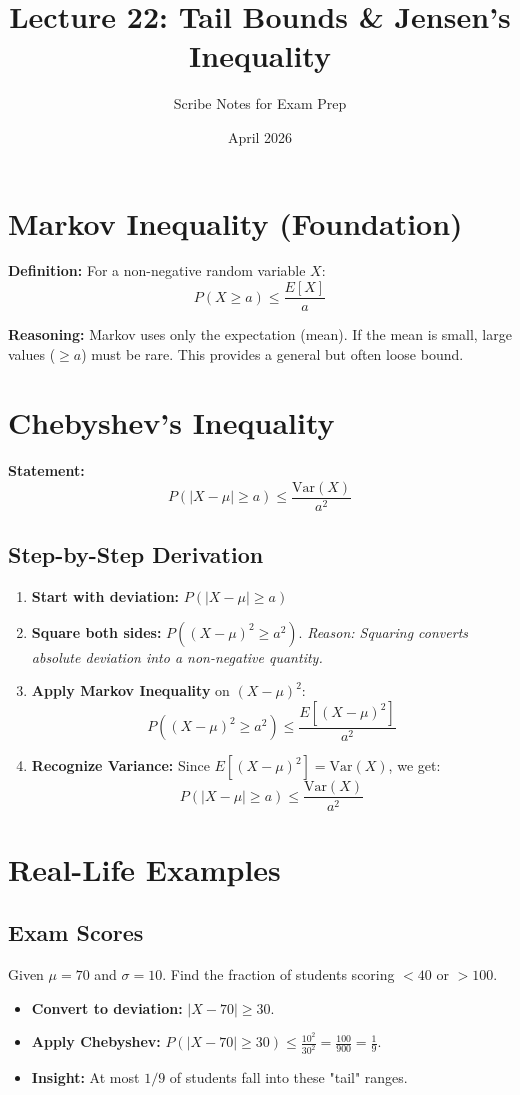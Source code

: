 \documentclass[11pt]{article}
\title{\textbf{Lecture 22: Tail Bounds \& Jensen’s Inequality}}
\author{Scribe Notes for Exam Prep}
\date{April 2026}
\begin{document}
\maketitle

\section{Markov Inequality (Foundation)}
\textbf{Definition:} For a non-negative random variable $X$:
\[ P(X \ge a) \le \frac{E[X]}{a} \]

\begin{insightbox}
\textbf{Reasoning:} Markov uses only the expectation (mean). If the mean is small, large values ($\ge a$) must be rare. This provides a general but often loose bound.
\end{insightbox}

\section{Chebyshev’s Inequality}
\textbf{Statement:} 
\[ P(|X - \mu| \ge a) \le \frac{\text{Var}(X)}{a^2} \]

\subsection{Step-by-Step Derivation}
\begin{enumerate}
    \item \textbf{Start with deviation:} $P(|X - \mu| \ge a)$
    \item \textbf{Square both sides:} $P((X - \mu)^2 \ge a^2)$. 
    \textit{Reason: Squaring converts absolute deviation into a non-negative quantity.}
    \item \textbf{Apply Markov Inequality} on $(X - \mu)^2$:
    \[ P((X - \mu)^2 \ge a^2) \le \frac{E[(X - \mu)^2]}{a^2} \]
    \item \textbf{Recognize Variance:} Since $E[(X - \mu)^2] = \text{Var}(X)$, we get:
    \[ P(|X - \mu| \ge a) \le \frac{\text{Var}(X)}{a^2} \]
\end{enumerate}

\section{Real-Life Examples}
\subsection{Exam Scores}
Given $\mu = 70$ and $\sigma = 10$. Find the fraction of students scoring $< 40$ or $> 100$.
\begin{itemize}
    \item \textbf{Convert to deviation:} $|X - 70| \ge 30$.
    \item \textbf{Apply Chebyshev:} $P(|X - 70| \ge 30) \le \frac{10^2}{30^2} = \frac{100}{900} = \frac{1}{9}$.
    \item \textbf{Insight:} At most $1/9$ of students fall into these "tail" ranges.
\end{itemize}
\end{document}
